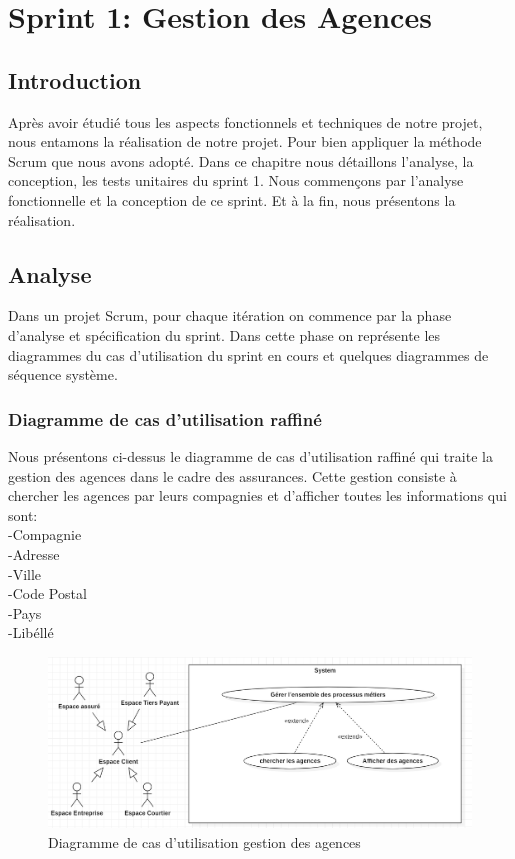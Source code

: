 \chapter{Sprint 1: Gestion des Agences}

\section*{Introduction}
Après avoir étudié tous les aspects fonctionnels et techniques de notre projet, nous entamons la réalisation de notre projet. Pour bien appliquer la méthode Scrum que nous avons adopté. Dans ce chapitre nous détaillons l’analyse, la conception, les tests unitaires du sprint 1. Nous commençons par l’analyse fonctionnelle et la conception de ce sprint. Et à la fin, nous présentons la réalisation.

\section{Analyse}
Dans un projet Scrum, pour chaque itération on commence par la phase d’analyse et spécification du sprint. Dans cette phase on représente les diagrammes du cas d’utilisation du sprint en cours et quelques diagrammes de séquence système.

\subsection{Diagramme de cas d’utilisation raffiné}
Nous présentons ci-dessus le diagramme de cas d’utilisation raffiné qui traite la gestion des agences dans le cadre des assurances.
\newpage
Cette gestion consiste à chercher les agences par leurs compagnies et d'afficher toutes les informations qui sont:\\
-Compagnie\\
-Adresse\\
-Ville\\
-Code Postal\\
-Pays\\
-Libéllé\\

\begin{figure}[H]
\centering
\includegraphics[width=1\columnwidth]{images/use2.PNG}
\caption{Diagramme de cas d'utilisation gestion des agences}
\label{fig:Diagramme de cas d'utilisation sprint 1}
\end{figure}

